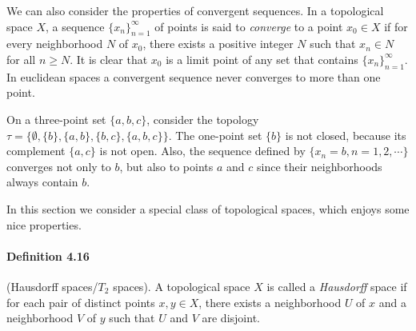 \documentclass{article}
\numberwithin{equation}{section}
\theoremstyle{plain}
\theoremstyle{definition}
\begin{document}
We can also consider the properties of convergent sequences. In a topological space $X$, a sequence $\{x_n\}_{n=1}^\infty$ of points is said to \textit{converge} to a point $x_0\in X$ if for every neighborhood $N$ of $x_0$, there exists a positive integer $N$ such that $x_n\in N$ for all $n\geq N$. It is clear that $x_0$ is a limit point of any set that contains $\{x_n\}_{n=1}^\infty$. In euclidean spaces a convergent sequence never converges to more than one point.

On a three-point set $\{a,b,c\}$, consider the topology $\tau = \{\emptyset,\{b\},\{a,b\},\{b,c\},\{a,b,c\}\}$. The one-point set $\{b\}$ is not closed, because its complement $\{a,c\}$ is not open. Also, the sequence defined by $\{x_n=b,n=1,2,\cdots\}$ converges not only to $b$, but also to points $a$ and $c$ since their neighborhoods always contain $b$.

In this section we consider a special class of topological spaces, which enjoys some nice properties.

\paragraph{Definition 4.16\label{def:4.16}} (Hausdorff spaces/$T_2$ spaces). A topological space $X$ is called a \textit{Hausdorff} space if for each pair of distinct points $x,y\in X$, there exists a neighborhood $U$ of $x$ and a neighborhood $V$ of $y$ such that $U$ and $V$ are disjoint.
\end{document}
